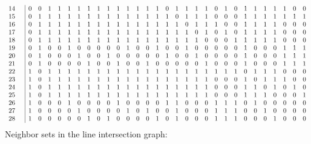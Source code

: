 \documentclass{article}
\begin{document}
{{$$\begin{array}{rr|*{29}r}
14 &  & 0 & 0 & 1 & 1 & 1 & 1 & 1 & 1 & 1 & 1 & 1 & 1 & 1 & 1 & 0 & 1 & 1 & 1 & 1 & 0 & 1 & 0 & 1 & 1 & 1 & 1 & 1 & 0 & 0\\
15 &  & 0 & 1 & 1 & 1 & 1 & 1 & 1 & 1 & 1 & 1 & 1 & 1 & 1 & 1 & 1 & 0 & 1 & 1 & 1 & 0 & 0 & 0 & 1 & 1 & 1 & 1 & 1 & 1 & 1\\
16 &  & 0 & 1 & 1 & 1 & 1 & 1 & 1 & 1 & 1 & 1 & 1 & 1 & 1 & 1 & 1 & 1 & 0 & 1 & 1 & 1 & 0 & 0 & 1 & 1 & 1 & 1 & 0 & 0 & 0\\
17 &  & 0 & 1 & 1 & 1 & 1 & 1 & 1 & 1 & 1 & 1 & 1 & 1 & 1 & 1 & 1 & 1 & 1 & 0 & 1 & 0 & 1 & 0 & 1 & 1 & 1 & 1 & 0 & 0 & 0\\
18 &  & 0 & 1 & 1 & 1 & 1 & 1 & 1 & 1 & 1 & 1 & 1 & 1 & 1 & 1 & 1 & 1 & 1 & 1 & 0 & 0 & 0 & 1 & 1 & 1 & 1 & 1 & 0 & 0 & 0\\
19 &  & 0 & 1 & 0 & 0 & 1 & 0 & 0 & 0 & 0 & 0 & 1 & 0 & 0 & 1 & 0 & 0 & 1 & 0 & 0 & 0 & 0 & 0 & 1 & 0 & 0 & 0 & 1 & 1 & 1\\
20 &  & 0 & 1 & 0 & 0 & 0 & 1 & 0 & 0 & 1 & 0 & 0 & 0 & 0 & 0 & 1 & 0 & 0 & 1 & 0 & 0 & 0 & 0 & 1 & 0 & 0 & 0 & 1 & 1 & 1\\
21 &  & 0 & 1 & 0 & 0 & 0 & 0 & 1 & 0 & 0 & 1 & 0 & 0 & 1 & 0 & 0 & 0 & 0 & 0 & 1 & 0 & 0 & 0 & 1 & 0 & 0 & 0 & 1 & 1 & 1\\
22 &  & 1 & 0 & 1 & 1 & 1 & 1 & 1 & 1 & 1 & 1 & 1 & 1 & 1 & 1 & 1 & 1 & 1 & 1 & 1 & 1 & 1 & 1 & 0 & 1 & 1 & 1 & 0 & 0 & 0\\
23 &  & 1 & 0 & 1 & 1 & 1 & 1 & 1 & 1 & 1 & 1 & 1 & 1 & 1 & 1 & 1 & 1 & 1 & 1 & 1 & 0 & 0 & 0 & 1 & 0 & 1 & 1 & 1 & 0 & 0\\
24 &  & 1 & 0 & 1 & 1 & 1 & 1 & 1 & 1 & 1 & 1 & 1 & 1 & 1 & 1 & 1 & 1 & 1 & 1 & 1 & 0 & 0 & 0 & 1 & 1 & 0 & 1 & 0 & 1 & 0\\
25 &  & 1 & 0 & 1 & 1 & 1 & 1 & 1 & 1 & 1 & 1 & 1 & 1 & 1 & 1 & 1 & 1 & 1 & 1 & 1 & 0 & 0 & 0 & 1 & 1 & 1 & 0 & 0 & 0 & 1\\
26 &  & 1 & 0 & 0 & 0 & 1 & 0 & 0 & 0 & 0 & 1 & 0 & 0 & 0 & 0 & 1 & 1 & 0 & 0 & 0 & 1 & 1 & 1 & 0 & 1 & 0 & 0 & 0 & 0 & 0\\
27 &  & 1 & 0 & 0 & 0 & 0 & 1 & 0 & 0 & 0 & 0 & 1 & 0 & 1 & 0 & 0 & 1 & 0 & 0 & 0 & 1 & 1 & 1 & 0 & 0 & 1 & 0 & 0 & 0 & 0\\
28 &  & 1 & 0 & 0 & 0 & 0 & 0 & 1 & 0 & 1 & 0 & 0 & 0 & 0 & 1 & 0 & 1 & 0 & 0 & 0 & 1 & 1 & 1 & 0 & 0 & 0 & 1 & 0 & 0 & 0\\
\end{array}
$$
}%
Neighbor sets in the line intersection graph:\\
}
\end{document}
